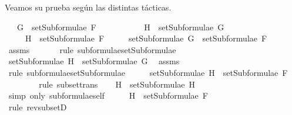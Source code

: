 \begin{isabellebody}
\begin{isamarkuptext}
  Veamos su prueba según las distintas tácticas.%
\end{isamarkuptext}\isamarkuptrue%
\isamarkupfalse%
\isanewline
\ \ \ {\isachardoublequoteopen}G\ {\isasymin}\ setSubformulae\ F{\isachardoublequoteclose}\ \isanewline
\ \ \ \ \ \ \ \ \ \ {\isachardoublequoteopen}H\ {\isasymin}\ setSubformulae\ G{\isachardoublequoteclose}\isanewline
\ \ \ \ \ {\isachardoublequoteopen}H\ {\isasymin}\ setSubformulae\ F{\isachardoublequoteclose}\isanewline
%
\isadelimproof
%
\endisadelimproof
%
\isatagproof
{}\isamarkupfalse%
\ {\isacharminus}\isanewline
\ \ \isamarkupfalse%
\ {}{\isacharcolon}{\isachardoublequoteopen}setSubformulae\ G\ {\isasymsubseteq}\ setSubformulae\ F{\isachardoublequoteclose}\ \isamarkupfalse%
\ assms{\isacharparenleft}{}{\isacharparenright}\ \isanewline
\ \ \ \ \isamarkupfalse%
\ {\isacharparenleft}rule\ subformulae{\isacharunderscore}setSubformulae{\isacharparenright}\isanewline
\ \ \isamarkupfalse%
\ {\isachardoublequoteopen}setSubformulae\ H\ {\isasymsubseteq}\ setSubformulae\ G{\isachardoublequoteclose}\ \isamarkupfalse%
\ assms{\isacharparenleft}{}{\isacharparenright}\ \isanewline
\ \ \ \ \isamarkupfalse%
\ {\isacharparenleft}rule\ subformulae{\isacharunderscore}setSubformulae{\isacharparenright}\isanewline
\ \ \isamarkupfalse%
\ \isamarkupfalse%
\ {}{\isacharcolon}{\isachardoublequoteopen}setSubformulae\ H\ {\isasymsubseteq}\ setSubformulae\ F{\isachardoublequoteclose}\ \isamarkupfalse%
\ {}\ \isanewline
\ \ \ \ \isamarkupfalse%
\ {\isacharparenleft}rule\ subset{\isacharunderscore}trans{\isacharparenright}\isanewline
\ \ \isamarkupfalse%
\ {\isachardoublequoteopen}H\ {\isasymin}\ setSubformulae\ H{\isachardoublequoteclose}\ \isanewline
\ \ \ \ \isamarkupfalse%
\ {\isacharparenleft}simp\ only{\isacharcolon}\ subformulae{\isacharunderscore}self{\isacharparenright}\isanewline
\ \ \isamarkupfalse%
\ \isamarkupfalse%
\ {\isachardoublequoteopen}H\ {\isasymin}\ setSubformulae\ F{\isachardoublequoteclose}\ \isanewline
\ \ \ \ \isamarkupfalse%
\ {}\ \isanewline
\ \ \ \ \isamarkupfalse%
\ {\isacharparenleft}rule\ rev{\isacharunderscore}subsetD{\isacharparenright}\isanewline
{}\isamarkupfalse%
%
\endisatagproof

\end{isabellebody}
